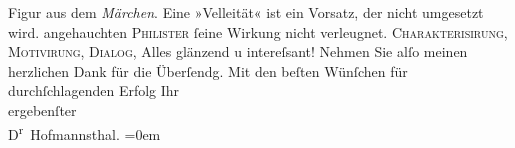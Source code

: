 \begin{ledgroupsized}[t]{13cm}
{{{                  Figur aus dem \emph{Märchen}. Eine »Velleität« ist
                  ein Vorsatz, der nicht umgesetzt wird.}}}\label{K_L00050-1h} angehauchten \textsc{Philister} ſeine {\pb}Wirkung nicht verleugnet.
                  \textsc{Charakterisirung}, \textsc{Motivirung},
                  \textsc{Dialog}, Alles glänzend u intereſsant!\pend
           \pstart
           Nehmen Sie alſo meinen herzlichen Dank für die Überſendg.\pend
           \pstart
           Mit den beſten Wünſchen für durchſchlagenden Erfolg Ihr{\\[\baselineskip]}ergebenſter{\\[\baselineskip]}\spacefill\mbox{D\textsuperscript{r} Hofmannsthal.}\pend
           \leftskip=0em{}
         
         \endnumbering{}\end{ledgroupsized}  \newcommand{\dateiname}{L00050}\newcommand{\titel}{Hugo August von Hofmannsthal an Arthur Schnitzler, 7. 12. 1891}\newcommand{\editorInnen}{Martin Anton Müller und Gerd-Hermann Susen}
      